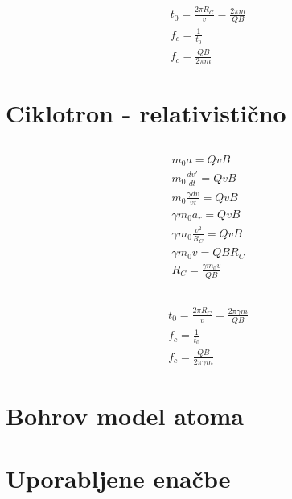 \documentclass[a4paper,12pt]{article}
\begin{document}
\subsection{}
\begin{align}
    t_0 = \frac{2 \pi R_C}{v} = \frac{2 \pi m}{Q B} \\
    f_c = \frac{1}{t_0} \\
    f_c = \frac{Q B}{2 \pi m}
\end{align}

\section{Ciklotron - relativistično}
\subsection{}
\begin{align}
    m_0 a = Q v B \\
    m_0 \frac{dv'}{dt} = Q v B \\
    m_0 \frac{\gamma dv}{vt} = Q v B \\
    \gamma m_0 a_r = Q v B \\
    \gamma m_0 \frac{v^2}{R_C} = Q v B \\
    \gamma m_0 v = Q B R_C \\
    R_C = \frac{\gamma m_0 v}{Q B}
\end{align}

\subsection{}
\begin{align}
    t_0 = \frac{2 \pi R_C}{v} = \frac{2 \pi \gamma m}{Q B} \\
    f_c = \frac{1}{t_0} \\
    f_c = \frac{Q B}{2 \pi \gamma m}
\end{align}

\newpage
\section{Bohrov model atoma}





\newpage
\section{Uporabljene enačbe}
\end{document}
